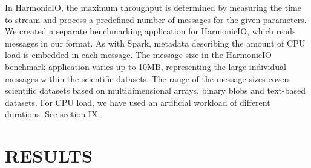 \documentclass[conference]{IEEEtran}
\begin{document}
In HarmonicIO, the maximum throughput is determined by measuring the time to stream and process a predefined number of messages for the given parameters. 
We created a separate benchmarking application for HarmonicIO, which reads messages in our format. As with Spark, metadata describing the amount of CPU load is embedded in each message. 
The message size in the HarmonicIO benchmark application varies up to 10MB, representing the large individual messages within the scientific datasets. The range of the message sizes covers scientific datasets based on multidimensional arrays, binary blobs and text-based datasets. For CPU load, we have used an artificial workload of different durations. See section IX.




\section{RESULTS}\label{results}

\end{document}
